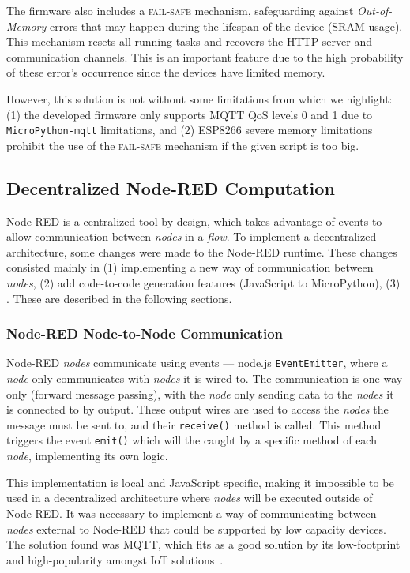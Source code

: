 The firmware also includes a \textsc{fail-safe} mechanism, safeguarding against \textit{Out-of-Memory} errors that may happen during the lifespan of the device (SRAM usage). This mechanism resets all running tasks and recovers the HTTP server and communication channels. This is an important feature due to the high probability of these error's occurrence since the devices have limited memory. 

However, this solution is not without some limitations from which we highlight: (1) the developed firmware only supports MQTT QoS levels 0 and 1 due to \texttt{MicroPython-mqtt} limitations, and (2) ESP8266 severe memory limitations prohibit the use of the \textsc{fail-safe} mechanism if the given script is too big.

\subsection{Decentralized Node-RED Computation}\label{sec:node_red_decentralization}

Node-RED is a centralized tool by design, which takes advantage of events to allow communication between \textit{nodes} in a \textit{flow}. To implement a decentralized architecture, some changes were made to the Node-RED runtime. These changes consisted mainly in (1) implementing a new way of communication between \textit{nodes}, (2) add code-to-code generation features (\ie JavaScript to MicroPython), (3) . These are described in the following sections.

\subsubsection{Node-RED Node-to-Node Communication}\label{sec:mqtt_support}

Node-RED \textit{nodes} communicate using events --- node.js \texttt{EventEmitter}, where a \textit{node} only communicates with \textit{nodes} it is wired to. The communication is one-way only (forward message passing), with the \textit{node} only sending data to the \textit{nodes} it is connected to by output. These output wires are used to access the \textit{nodes} the message must be sent to, and their \texttt{receive()} method is called. This method triggers the event \texttt{emit()} which will the caught by a specific method of each \textit{node}, implementing its own logic.

This implementation is local and JavaScript specific, making it impossible to be used in a decentralized architecture where \textit{nodes} will be executed outside of Node-RED. It was necessary to implement a way of communicating between \textit{nodes} external to Node-RED that could be supported by low capacity devices. The solution found was MQTT, which fits as a good solution by its low-footprint and high-popularity amongst IoT solutions~\cite{soni2017survey}.

